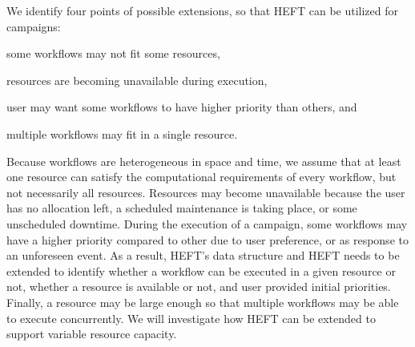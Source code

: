We identify four points of possible extensions, so that HEFT can be utilized for campaigns:
\begin{inparaenum}[(i)]
    \item some workflows may not fit some resources,
    \item resources are becoming unavailable during execution,
    \item user may want some workflows to have higher priority than others, and
    \item multiple workflows may fit in a single resource.
\end{inparaenum}
Because workflows are heterogeneous in space and time, we assume that at least one resource can satisfy the computational requirements of every workflow, but not necessarily all resources.
Resources may become unavailable because the user has no allocation left, a scheduled maintenance is taking place, or some unscheduled downtime.
During the execution of a campaign, some workflows may have a higher priority compared to other due to user preference, or as response to an unforeseen event.
As a result, HEFT's data structure and HEFT needs to be extended to identify whether a workflow can be executed in a given resource or not, whether a resource is available or not, and user provided initial priorities.
Finally, a resource may be large enough so that multiple workflows may be able to execute concurrently.
We will investigate how HEFT can be extended to support variable resource capacity.


